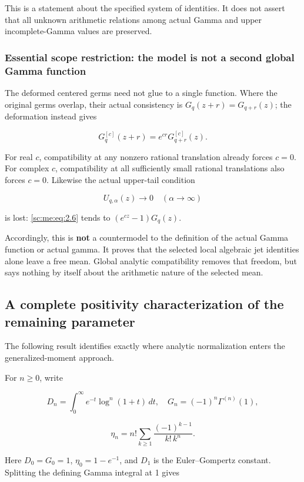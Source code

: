 \documentclass[11pt,a4paper]{article}
\theoremstyle{definition}
\theoremstyle{remark}
\theoremstyle{plain}
\numberwithin{equation}{section}
\begin{document}
This is a statement about the specified system of identities. It does
not assert that all unknown arithmetic relations among actual Gamma and
upper incomplete-Gamma values are preserved.

\subsubsection{Essential scope restriction: the model is not a second
global Gamma
function}\label{sc:me:essential-scope-restriction-the-model-is-not-a-second-global-gamma-function}

The deformed centered germs need not glue to a single function. Where
the original germs overlap, their actual consistency is
\(G_q(z+r)=G_{q+r}(z)\); the deformation instead gives

\[
G_q^{[c]}(z+r)=e^{cr}G_{q+r}^{[c]}(z).
\tag{ME.2.9}\label{sc:me:eq:2.9}
\]

For real \(c\), compatibility at any nonzero rational translation
already forces \(c=0\). For complex \(c\), compatibility at all
sufficiently small rational translations also forces \(c=0\). Likewise
the actual upper-tail condition

\[
U_{q,\alpha}(z)\longrightarrow0\quad(\alpha\to\infty)
\]

is lost: \eqref{sc:me:eq:2.6} tends to \((e^{cz}-1)G_q(z)\).

Accordingly, this is \textbf{not} a countermodel to the definition of
the actual Gamma function or actual gamma. It proves that the selected
local algebraic jet identities alone leave a free mean. Global analytic
compatibility removes that freedom, but says nothing by itself about the
arithmetic nature of the selected mean.

\subsection{A complete positivity characterization of the remaining
parameter}\label{sc:me:a-complete-positivity-characterization-of-the-remaining-parameter}

The following result identifies exactly where analytic normalization
enters the generalized-moment approach.

For \(n\ge0\), write

\[
D_n=\int_0^\infty e^{-t}\log^n(1+t)\,dt,
\quad
G_n=(-1)^n\Gamma^{(n)}(1),
\]

\[
\eta_n=n!\sum_{k\ge1}\frac{(-1)^{k-1}}{k!\,k^n}.
\]

Here \(D_0=G_0=1\), \(\eta_0=1-e^{-1}\), and \(D_1\) is the
Euler--Gompertz constant. Splitting the defining Gamma integral at 1
gives
\end{document}
